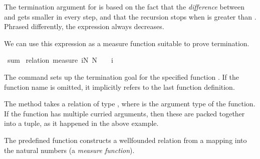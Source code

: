 \begin{isabellebody}
\begin{isamarkuptext}
  The termination argument for  is based on the fact that
  the \emph{difference} between  and  gets
  smaller in every step, and that the recursion stops when 
  is greater than . Phrased differently, the expression 
   always decreases.

  We can use this expression as a measure function suitable to prove termination.%
\end{isamarkuptext}%
\isamarkuptrue%
\isamarkupfalse%
\ sum\isanewline
%
\isadelimproof
%
\endisadelimproof
%
\isatagproof
{}\isamarkupfalse%
\ {}relation\ {}measure\ {}{}{}i{}N{}{}\ N\ {}\ {}\ {}\ i{}{}{}%
\begin{isamarkuptxt}%
The  command sets up the termination goal for the
  specified function . If the function name is omitted, it
  implicitly refers to the last function definition.

  The  method takes a relation of
  type , where  is the argument type of
  the function. If the function has multiple curried arguments, then
  these are packed together into a tuple, as it happened in the above
  example.

  The predefined function  constructs a
  wellfounded relation from a mapping into the natural numbers (a
  \emph{measure function}). 


\end{isamarkuptxt}
\end{isabellebody}
